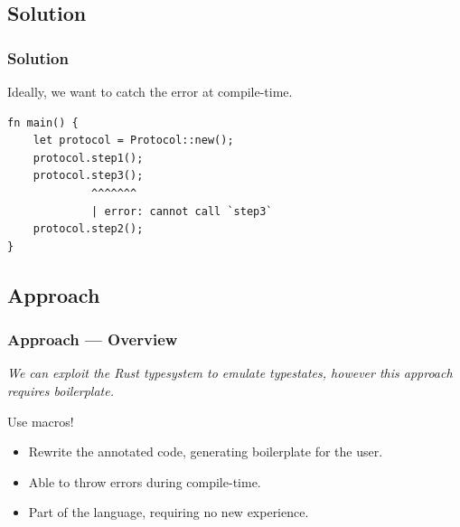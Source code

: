 \documentclass[bigger,notes]{beamer}
\begin{document}
\subsection{Solution}
\begin{frame}[fragile]
    \frametitle{Solution}
    Ideally, we want to catch the error at compile-time.
    \begin{listing}
        \centering
        \begin{verbatim}
fn main() {
    let protocol = Protocol::new();
    protocol.step1();
    protocol.step3();
             ^^^^^^^
             | error: cannot call `step3`
    protocol.step2();
}
        \end{verbatim}
    \end{listing}

\end{frame}

\subsection{Approach}
\begin{frame}
    \frametitle{Approach --- Overview}

    \emph{We can exploit the Rust typesystem to emulate typestates,
        however this approach requires boilerplate.}

    Use macros!
    \begin{itemize}
        \item Rewrite the annotated code, generating boilerplate for the user.
        \item Able to throw errors during compile-time.
        \item Part of the language, requiring no new experience.
    \end{itemize}

\end{frame}
\end{document}
